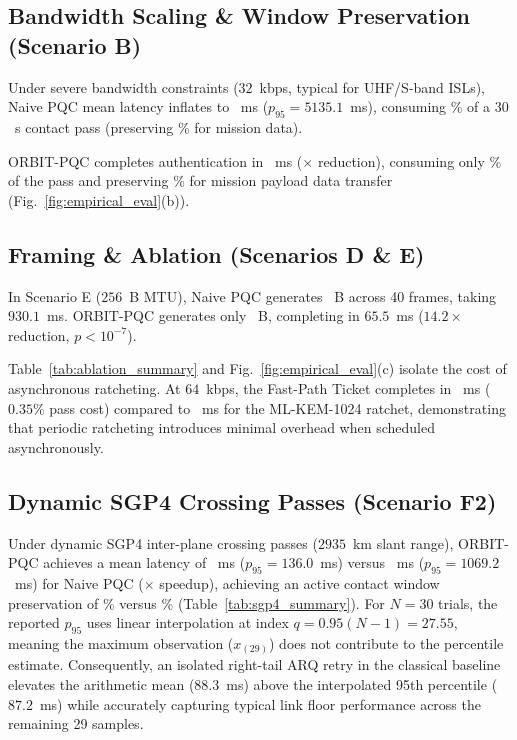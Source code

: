 \documentclass[lettersize,journal]{IEEEtran}
\begin{document}
\subsection{Bandwidth Scaling \& Window Preservation (Scenario B)}
Under severe bandwidth constraints ($32$~kbps, typical for UHF/S-band ISLs), Naive PQC mean latency inflates to \NaiveMeanRateThirtyTwo~ms ($p_{95} = 5135.1$~ms), consuming \NaivePassCostThirtyTwo\% of a $30$~s contact pass (preserving \NaivePreservedThirtyTwo\% for mission data).

ORBIT-PQC completes authentication in \OrbitMeanRateThirtyTwo~ms (\SpeedupRateThirtyTwo$\times$ reduction), consuming only \OrbitPassCostThirtyTwo\% of the pass and preserving \OrbitPreservedThirtyTwo\% for mission payload data transfer (Fig.~\ref{fig:empirical_eval}(b)).

\subsection{Framing \& Ablation (Scenarios D \& E)}
In Scenario E ($256$~B MTU), Naive PQC generates \NaiveWireBytesMtuTwoFiftySix~B across 40 frames, taking $930.1$~ms. ORBIT-PQC generates only \OrbitWireBytesMtuTwoFiftySix~B, completing in $65.5$~ms ($14.2\times$ reduction, $p < 10^{-7}$).



Table~\ref{tab:ablation_summary} and Fig.~\ref{fig:empirical_eval}(c) isolate the cost of asynchronous ratcheting. At $64$~kbps, the Fast-Path Ticket completes in \OrbitFastPathMeanSixtyFour~ms ($0.35\%$ pass cost) compared to \OrbitRatchetMeanSixtyFour~ms for the ML-KEM-1024 ratchet, demonstrating that periodic ratcheting introduces minimal overhead when scheduled asynchronously.

\subsection{Dynamic SGP4 Crossing Passes (Scenario F2)}


Under dynamic SGP4 inter-plane crossing passes ($2935$~km slant range), ORBIT-PQC achieves a mean latency of \OrbitMeanCrossingLatency~ms ($p_{95} = 136.0$~ms) versus \NaiveMeanCrossingLatency~ms ($p_{95} = 1069.2$~ms) for Naive PQC (\CrossingSpeedup$\times$ speedup), achieving an active contact window preservation of \OrbitEtaWinCrossingNinetyFive\% versus \NaiveEtaWinCrossingNinetyFive\% (Table~\ref{tab:sgp4_summary}). For $N=30$ trials, the reported $p_{95}$ uses linear interpolation at index $q = 0.95(N-1) = 27.55$, meaning the maximum observation ($x_{(29)}$) does not contribute to the percentile estimate. Consequently, an isolated right-tail ARQ retry in the classical baseline elevates the arithmetic mean ($88.3$~ms) above the interpolated 95th percentile ($87.2$~ms) while accurately capturing typical link floor performance across the remaining 29 samples.
\end{document}
